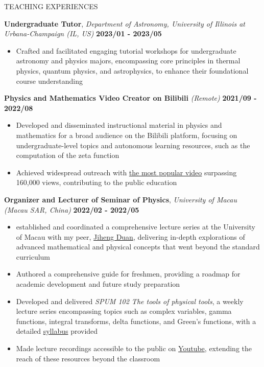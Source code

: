 \documentclass[10pt]{article} %
\begin{document}
\begin{section}{TEACHING EXPERIENCES}

\textbf{Undergraduate Tutor}, \textit{Department of Astronomy, University of Illinois at Urbana-Champaign (IL, US)} \hfill \textbf{2023/01 - 2023/05}
\begin{itemize}[leftmargin=1.5em]
    \item Crafted and facilitated engaging tutorial workshops for undergraduate astronomy and physics majors, encompassing core principles in thermal physics, quantum physics, and astrophysics, to enhance their foundational course understanding
\end{itemize}

\textbf{Physics and Mathematics Video Creator on Bilibili} \textit{(Remote)} \hfill \textbf{2021/09 - 2022/08}
\begin{itemize}[leftmargin=1.5em]
    \item Developed and disseminated instructional material in physics and mathematics for a broad audience on the Bilibili platform, focusing on undergraduate-level topics and autonomous learning resources, such as the computation of the zeta function
    \item Achieved widespread outreach with \href{https://www.bilibili.com/video/BV1th411W7xu/}{the most popular video} surpassing 160,000 views, contributing to the public education
\end{itemize}

\textbf{Organizer and Lecturer of Seminar of Physics}, \textit{University of Macau (Macau SAR, China)} \hfill \textbf{2022/02 - 2022/05}
\begin{itemize}[leftmargin=1.5em]
    \item established and coordinated a comprehensive lecture series at the University of Macau with my peer, \href{http://runawayfancy.me/}{Jiheng Duan}, delivering in-depth explorations of advanced mathematical and physical concepts that went beyond the standard curriculum
    \item Authored a comprehensive guide for freshmen, providing a roadmap for academic development and future study preparation
    \item Developed and delivered \textit{SPUM 102 The tools of physical tools}, a weekly lecture series encompassing topics such as complex variables, gamma functions, integral transforms, delta functions, and Green's functions, with a detailed \href{https://github.com/Chisen-Lupus/Seminar-of-Physics-UM/blob/main/SPUM%20102%20The%20tools%20of%20physical%20tool.pdf}{syllabus} provided
    \item Made lecture recordings accessible to the public on \href{https://www.youtube.com/watch?v=nQkv03r-XeQ&list=PLV9fHDZW7hHWQ9rrAk7c9kdeV-Lqyt7pV&index=10}{Youtube}, extending the reach of these resources beyond the classroom
\end{itemize}


\end{section}
\end{document}
